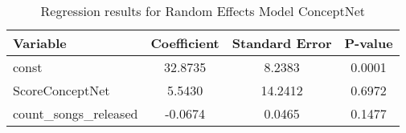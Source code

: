 \begin{table}[htbp]
\centering
\caption{Regression results for Random Effects Model ConceptNet}
\begin{tabular}{lccc}
\hline
Variable & Coefficient & Standard Error & P-value \\ 
\hline
const & 32.8735 & 8.2383 & 0.0001 \\ 
ScoreConceptNet & 5.5430 & 14.2412 & 0.6972 \\ 
count_songs_released & -0.0674 & 0.0465 & 0.1477 \\ 
\hline
\end{tabular}
\end{table}
